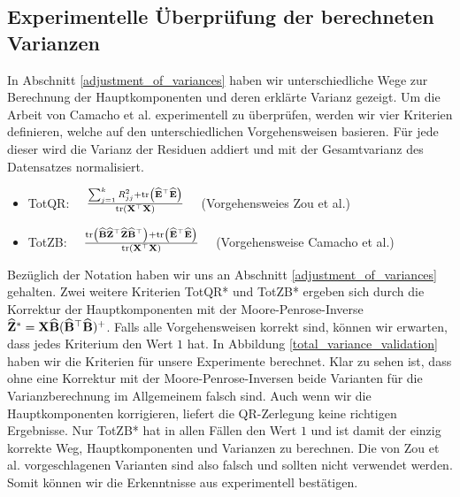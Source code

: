 \subsection{Experimentelle Überprüfung der berechneten Varianzen}

In Abschnitt \ref{adjustment_of_variances} haben wir unterschiedliche Wege zur Berechnung der Hauptkomponenten und deren erklärte Varianz gezeigt. Um die Arbeit von Camacho et al. \cite{camacho} experimentell zu überprüfen, werden wir vier Kriterien definieren, welche auf den unterschiedlichen Vorgehensweisen basieren. Für jede dieser wird die Varianz der Residuen addiert und mit der Gesamtvarianz des Datensatzes normalisiert.
\begin{itemize}
\item TotQR: $\quad \frac{\sum_{j=1}^k R_{jj}^2 + \text{tr} \left( \widehat{\mathbf{E}}^{\top}\widehat{\mathbf{E}} \right)}{\text{tr} \left( \mathbf{X}^{\top}\mathbf{X} \right)} \quad$ (Vorgehensweies Zou et al.)
\item TotZB: $\quad \frac{\text{tr} \left( \widehat{\mathbf{B}} \widehat{\mathbf{Z}}^{\top} \widehat{\mathbf{Z}} \widehat{\mathbf{B}}^{\top} \right) + \text{tr} \left( \widehat{\mathbf{E}}^{\top}\widehat{\mathbf{E}} \right)}{\text{tr} \left( \mathbf{X}^{\top}\mathbf{X} \right)} \quad$ (Vorgehensweise Camacho et al.)
\end{itemize}
Bezüglich der Notation haben wir uns an Abschnitt \ref{adjustment_of_variances} gehalten. Zwei weitere Kriterien TotQR* und TotZB* ergeben sich durch die Korrektur der Hauptkomponenten mit der Moore-Penrose-Inverse $\widehat{\mathbf{Z}}^* = \mathbf{X} \widehat{\mathbf{B}} (\widehat{\mathbf{B}}^{\top}\widehat{\mathbf{B}})^+$. Falls alle Vorgehensweisen korrekt sind, können wir erwarten, dass jedes Kriterium den Wert $1$ hat. In Abbildung \ref{total_variance_validation} haben wir die Kriterien für unsere Experimente berechnet. Klar zu sehen ist, dass ohne eine Korrektur mit der Moore-Penrose-Inversen beide Varianten für die Varianzberechnung im Allgemeinem falsch sind. Auch wenn wir die Hauptkomponenten korrigieren, liefert die QR-Zerlegung keine richtigen Ergebnisse. Nur TotZB* hat in allen Fällen den Wert $1$ und ist damit der einzig korrekte Weg, Hauptkomponenten und Varianzen zu berechnen. Die von Zou et al. \cite{zou_sparsepca} vorgeschlagenen Varianten sind also falsch und sollten nicht verwendet werden. Somit können wir die Erkenntnisse aus \cite{camacho} experimentell bestätigen.

